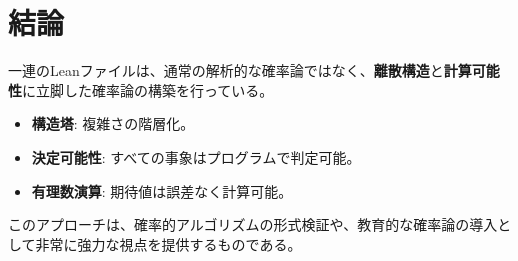 \documentclass[a4paper,11pt]{ltjsarticle}
\theoremstyle{definition}
\begin{document}
\section{結論}
一連のLeanファイルは、通常の解析的な確率論ではなく、\textbf{離散構造}と\textbf{計算可能性}に立脚した確率論の構築を行っている。
\begin{itemize}
    \item \textbf{構造塔}: 複雑さの階層化。
    \item \textbf{決定可能性}: すべての事象はプログラムで判定可能。
    \item \textbf{有理数演算}: 期待値は誤差なく計算可能。
\end{itemize}
このアプローチは、確率的アルゴリズムの形式検証や、教育的な確率論の導入として非常に強力な視点を提供するものである。
\end{document}
